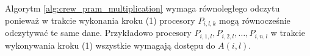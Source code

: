 \begin{uwaga}
Algorytm \ref{alg:crew_pram_multiplication} wymaga równoległego odczytu ponieważ w trakcie wykonania kroku (1) procesory \(P_{i,l,k}\) mogą równocześnie odczytywać te same dane. Przykładowo procesory \(P_{i,1,l},P_{i,2,l},\dots,P_{i,n,l}\) w trakcie wykonywania kroku (1) wszystkie wymagają dostępu do \(A(i,l)\).
\end{uwaga}



